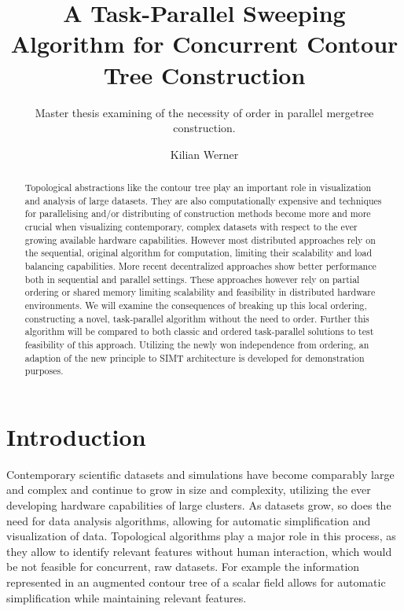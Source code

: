 \documentclass{scrartcl}
\begin{document}
  
\title {A Task-Parallel Sweeping Algorithm for Concurrent Contour Tree Construction}
\subtitle {Master thesis examining of the necessity of order in parallel mergetree construction.}
\author {Kilian Werner}
\maketitle
\begin{abstract}
Topological abstractions like the contour tree play an important role in visualization and analysis of large datasets. They are also computationally expensive and techniques for parallelising and/or distributing of construction methods become more and more crucial when visualizing contemporary, complex datasets with respect to the ever growing available hardware capabilities. However most distributed approaches rely on the sequential, original algorithm for computation, limiting their scalability and load balancing capabilities. More recent decentralized approaches show better performance both in sequential and parallel settings. These approaches however rely on partial ordering or shared memory limiting scalability and feasibility in distributed hardware environments. We will examine the consequences of breaking up this local ordering, constructing a novel, task-parallel algorithm without the need to order. Further this algorithm will be compared to both classic and ordered task-parallel solutions to test feasibility of this approach. Utilizing the newly won independence from ordering, an adaption of the new principle to SIMT architecture is developed for demonstration purposes.
\end{abstract}
\newpage
\tableofcontents
\newpage
{}

\section{Introduction}
Contemporary scientific datasets and simulations have become comparably large and complex and continue to grow in size and complexity, utilizing the ever developing hardware capabilities of large clusters. As datasets grow, so does the need for data analysis algorithms, allowing for automatic simplification and visualization of data. Topological algorithms play a major role in this process, as they allow to identify relevant features without human interaction, which would be not feasible for concurrent, raw datasets. For example the information represented in an augmented contour tree of a scalar field allows for automatic simplification while maintaining relevant features. 
\end{document}
